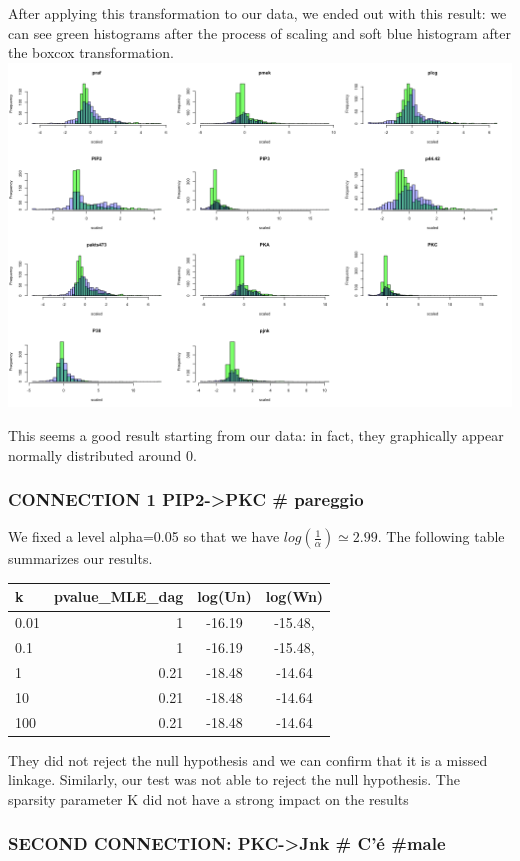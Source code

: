 \documentclass[
]{article}
\begin{document}
After applying this transformation to our data, we ended out with this
result: we can see green histograms after the process of scaling and
soft blue histogram after the boxcox transformation.
\includegraphics{data/distribution_plots/scaled_vs_normalized/pma.png}

This seems a good result starting from our data: in fact, they
graphically appear normally distributed around 0.

\hypertarget{connection-1-pip2-pkc-pareggio}{%
\subsubsection{CONNECTION 1 PIP2-\textgreater PKC \#
pareggio}\label{connection-1-pip2-pkc-pareggio}}

We fixed a level alpha=0.05 so that we have
\(log(\frac{1}{\alpha})\simeq2.99\). The following table summarizes our
results.

\begin{longtable}[]{@{}lrcc@{}}
\toprule
k & pvalue\_MLE\_dag & log(Un) & log(Wn)\tabularnewline
\midrule
\endhead
0.01 & 1 & -16.19 & -15.48,\tabularnewline
0.1 & 1 & -16.19 & -15.48,\tabularnewline
1 & 0.21 & -18.48 & -14.64\tabularnewline
10 & 0.21 & -18.48 & -14.64\tabularnewline
100 & 0.21 & -18.48 & -14.64\tabularnewline
\bottomrule
\end{longtable}

They did not reject the null hypothesis and we can confirm that it is a
missed linkage. Similarly, our test was not able to reject the null
hypothesis. The sparsity parameter K did not have a strong impact on the
results

\hypertarget{second-connection-pkc-jnk-cuxe9-male}{%
\subsubsection{SECOND CONNECTION: PKC-\textgreater Jnk \# C'é
\#male}\label{second-connection-pkc-jnk-cuxe9-male}}
\end{document}
